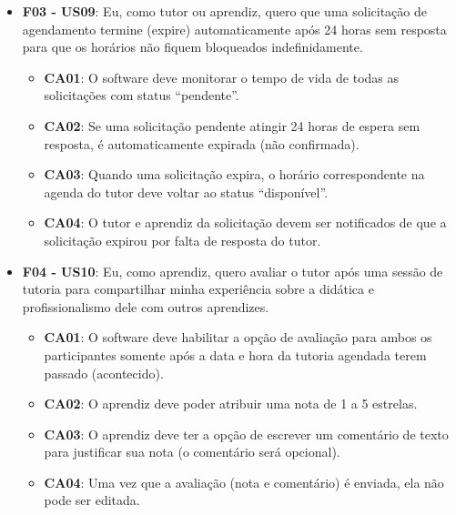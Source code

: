 \begin{itemize}
\begin{itemize}
\end{itemize}

\item \textbf{F03 - US09}: Eu, como tutor ou aprendiz, quero que uma solicitação de agendamento termine (expire) automaticamente após 24 horas sem resposta para que os horários não fiquem bloqueados indefinidamente.

\begin{itemize}

\item \textbf{CA01}: O software deve monitorar o tempo de vida de todas as solicitações com status ``pendente''.

\item \textbf{CA02}: Se uma solicitação pendente atingir 24 horas de espera sem resposta, é automaticamente expirada (não confirmada).

\item \textbf{CA03}: Quando uma solicitação expira, o horário correspondente na agenda do tutor deve voltar ao status ``disponível''.

\item \textbf{CA04}: O tutor e aprendiz da solicitação devem ser notificados de que a solicitação expirou por falta de resposta do tutor.

\end{itemize}

\item \textbf{F04 - US10}: Eu, como aprendiz, quero avaliar o tutor após uma sessão de tutoria para compartilhar minha experiência sobre a didática e profissionalismo dele com outros aprendizes.

\begin{itemize}

\item \textbf{CA01}: O software deve habilitar a opção de avaliação para ambos os participantes somente após a data e hora da tutoria agendada terem passado (acontecido).

\item \textbf{CA02}: O aprendiz deve poder atribuir uma nota de 1 a 5 estrelas.

\item \textbf{CA03}: O aprendiz deve ter a opção de escrever um comentário de texto para justificar sua nota (o comentário será opcional).

\item \textbf{CA04}: Uma vez que a avaliação (nota e comentário) é enviada, ela não pode ser editada.


\end{itemize}
\end{itemize}
